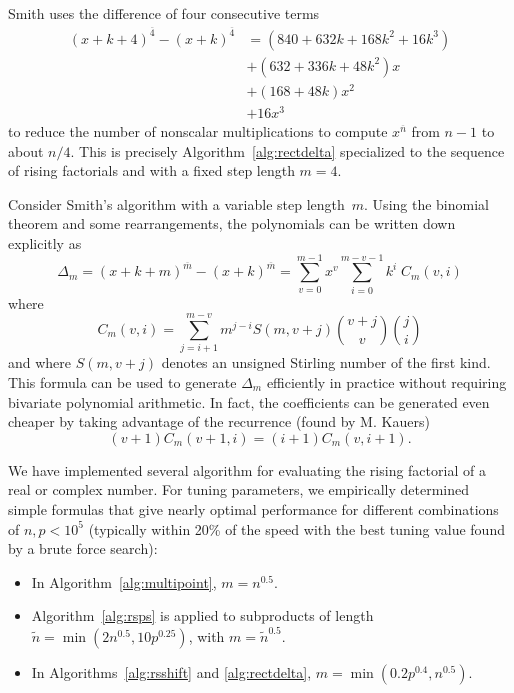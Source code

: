\documentclass{sig-alternate}
\begin{document}
Smith \cite{Smith2001} uses the difference of four consecutive terms
\begin{align*}
(x+k+4)^{\overline{4}} - (x+k)^{\overline{4}} & = (840 + 632 k + 168 k^2 + 16 k^3) \\
          & + (632 + 336 k + 48 k^2) x \\
          & + (168 + 48 k) x^2 \\
          & + 16 x^3
\end{align*}
to reduce the number of nonscalar multiplications to compute $x^{\overline{n}}$ from $n-1$
to about $n / 4$. This is precisely Algorithm~\ref{alg:rectdelta}
specialized to the sequence of rising factorials and with a fixed step length $m = 4$.

Consider Smith's algorithm with a variable step length~$m$.
Using the binomial theorem and some rearrangements,
the polynomials can be written down explicitly as
\begin{equation}
\Delta_m = (x+k+m)^{\overline{m}} - (x+k)^{\overline{m}}
 = \sum_{v=0}^{m-1} x^v \sum_{i=0}^{m-v-1} k^i \; C_m(v,i)
\end{equation}
where
\begin{equation}
C_m(v,i) = \sum_{j=i+1}^{m-v} m^{j-i} S(m,v+j) {{v+j} \choose v} {j \choose i}
\label{eq:ccoeff}
\end{equation}
and where $S(m,v+j)$ denotes an unsigned Stirling number of the first kind.
This formula can be used to generate $\Delta_m$ efficiently in practice without
requiring bivariate polynomial arithmetic. In fact, the coefficients can
be generated even cheaper by taking advantage of the recurrence (found by
M. Kauers)
\begin{equation}
(v+1) C_m(v+1,i) = (i+1) C_m(v, i+1).
\end{equation}

We have implemented several algorithm for evaluating the rising
factorial of a real or complex number.
For tuning parameters, we empirically determined simple
formulas that give nearly optimal
performance for different combinations of $n, p < 10^5$
(typically within 20\% of the speed with the best tuning
value found by a brute force search):
\begin{itemize}
\item In Algorithm~\ref{alg:multipoint}, $m = n^{0.5}$.
\item Algorithm~\ref{alg:rsps} is applied to subproducts of length $\tilde n = \min(2 n^{0.5}, 10 p^{0.25})$, with $m = \tilde n^{0.5}$.
\item In Algorithms~\ref{alg:rsshift} and \ref{alg:rectdelta}, $m = \min(0.2 p^{0.4}, n^{0.5})$.
\end{itemize}
\end{document}
